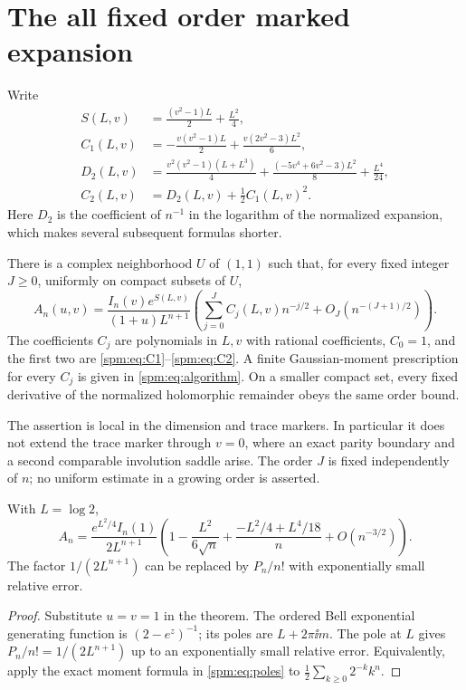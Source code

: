 \section{The all fixed order marked expansion}\label{spm:sec:theorem}
Write
\begin{align}
 S(L,v)&=\frac{(v^2-1)L}{2}+\frac{L^2}{4},\label{spm:eq:S}\\
 C_1(L,v)&=-\frac{v(v^2-1)L}{2}+\frac{v(2v^2-3)L^2}{6},\label{spm:eq:C1}\\
 D_2(L,v)&=\frac{v^2(v^2-1)(L+L^3)}4
          +\frac{(-5v^4+6v^2-3)L^2}{8}+\frac{L^4}{24},\label{spm:eq:D2}\\
 C_2(L,v)&=D_2(L,v)+\frac12C_1(L,v)^2.\label{spm:eq:C2}
\end{align}
Here $D_2$ is the coefficient of $n^{-1}$ in the logarithm of the normalized expansion, which makes several subsequent formulas shorter.

\begin{theorem}\label{spm:thm:main}
There is a complex neighborhood $U$ of $(1,1)$ such that, for every fixed integer $J\geq0$, uniformly on compact subsets of $U$,
\begin{equation}\label{spm:eq:main}
 A_n(u,v)=\frac{I_n(v)e^{S(L,v)}}{(1+u)L^{n+1}}
 \left(\sum_{j=0}^{J}C_j(L,v)n^{-j/2}
       +O_J(n^{-(J+1)/2})\right).
\end{equation}
The coefficients $C_j$ are polynomials in $L,v$ with rational coefficients, $C_0=1$, and the first two are \eqref{spm:eq:C1}--\eqref{spm:eq:C2}. A finite Gaussian-moment prescription for every $C_j$ is given in \eqref{spm:eq:algorithm}. On a smaller compact set, every fixed derivative of the normalized holomorphic remainder obeys the same order bound.
\end{theorem}

The assertion is local in the dimension and trace markers. In particular it does not extend the trace marker through $v=0$, where an exact parity boundary and a second comparable involution saddle arise. The order $J$ is fixed independently of $n$; no uniform estimate in a growing order is asserted.

\begin{corollary}\label{spm:cor:unmarked}
With $L=\log2$,
\begin{equation}\label{spm:eq:unmarked}
 A_n=\frac{e^{L^2/4}I_n(1)}{2L^{n+1}}
 \left(1-\frac{L^2}{6\sqrt n}
 +\frac{-L^2/4+L^4/18}{n}+O(n^{-3/2})\right).
\end{equation}
The factor $1/(2L^{n+1})$ can be replaced by $P_n/n!$ with exponentially small relative error.
\end{corollary}
\begin{proof}
Substitute $u=v=1$ in the theorem. The ordered Bell exponential generating function is $(2-e^z)^{-1}$; its poles are $L+2\pi\ii m$. The pole at $L$ gives $P_n/n!=1/(2L^{n+1})$ up to an exponentially small relative error. Equivalently, apply the exact moment formula in \eqref{spm:eq:poles} to $\frac12\sum_{k\geq0}2^{-k}k^n$.
\end{proof}

